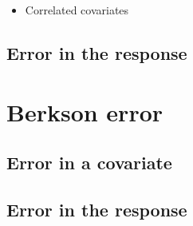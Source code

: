\documentclass[]{book}
\providecommand{\tightlist}{%
  \setlength{\itemsep}{0pt}\setlength{\parskip}{0pt}}
\theoremstyle{definition}
\theoremstyle{definition}
\theoremstyle{definition}
\theoremstyle{remark}
\begin{document}
\begin{itemize}
\tightlist
\item
  Correlated covariates
\end{itemize}

\subsection{Error in the response}\label{error-in-the-response-1}

\section{Berkson error}\label{berkson-error}

\subsection{Error in a covariate}\label{error-in-a-covariate-1}

\subsection{Error in the response}\label{error-in-the-response-2}


\end{document}
